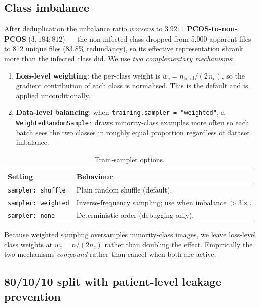 \documentclass[10pt,a4paper]{article}
\begin{document}
\subsection{Class imbalance}

After deduplication the imbalance ratio \emph{worsens} to
\textbf{$3.92{:}1$ PCOS-to-non-PCOS} ($3{,}184{:}812$) --- the
non-infected class dropped from 5{,}000 apparent files to 812 unique
files (83.8\% redundancy), so its effective representation shrank
more than the infected class did.
We use \emph{two complementary mechanisms}:

\begin{enumerate}[leftmargin=*]
  \item \textbf{Loss-level weighting}:
        the per-class weight is
        $w_c = n_{\text{total}} / (2\,n_c)$, so the gradient contribution
        of each class is normalised. This is the default and is
        applied unconditionally.
  \item \textbf{Data-level balancing}: when
        \texttt{training.sampler = "weighted"}, a
        \texttt{WeightedRandomSampler} draws minority-class examples
        more often so each batch sees the two classes in roughly equal
        proportion regardless of dataset imbalance.
\end{enumerate}

\begin{table}[h]
  \centering
  \begin{tabular}{ll}
    \toprule
    Setting & Behaviour \\
    \midrule
    \texttt{sampler: shuffle} & Plain random shuffle (default). \\
    \texttt{sampler: weighted} & Inverse-frequency sampling; use when imbalance $> 3{\times}$. \\
    \texttt{sampler: none} & Deterministic order (debugging only). \\
    \bottomrule
  \end{tabular}
  \caption{Train-sampler options.}
  \label{tab:sampler}
\end{table}

Because weighted sampling oversamples minority-class images, we leave
loss-level class weights at $w_c = n/(2 n_c)$ rather than doubling
the effect. Empirically the two mechanisms \emph{compound} rather than
cancel when both are active.

\subsection{80/10/10 split with patient-level leakage prevention}
\end{document}
